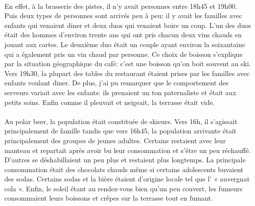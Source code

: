 \paragraph{} En effet, à la brasserie des pistes, il n'y avait personnes entre
18h45 et 19h00. Puis deux types de personnes sont arrivés peu à peu: il y avait
les familles avec enfants qui venaient diner et deux duos qui venaient boire un
coup. L'un des duos était des hommes d'environ trente ans qui ont pris chacun
deux vins chauds en jouant aux cartes. Le deuxième duo était un couple ayant
environ la soixantaine qui a également pris un vin chaud par personne. Ce choix
de boisson s'explique par la situation géographique du café: c'est une boisson
qu'on boit souvent au ski. Vers 19h30, la plupart des tables du restaurant
étaient prises par les familles avec enfants voulant diner. De plus, j'ai pu
remarquer que le comportement des serveurs variait avec les enfants: ils
prenaient un ton paternaliste et était aux petits soins. Enfin comme il
pleuvait et neigeait, la terrasse était vide.

\paragraph{} Au polar beer, la population était constituée de skieurs. Vers
16h, il s'agissait principalement de famille tandis que vers 16h45, la
population arrivante était principalement des groupes de jeunes adultes.
Certains restaient avec leur manteau et repartait après avoir bu leur
consommation et s'être un peu réchauffé. D'autres se déshabillaient un peu plus
et restaient plus longtemps. La principale consommation était des chocolats
chauds même si certains adolescents buvaient des sodas.  Certains sodas et la
bière étaient d'origine locale tel que l' « auvergnat cola ». Enfin, le soleil
étant au rendez-vous bien qu'un peu couvert, les fumeurs consommaient leurs
boissons et crêpes sur la terrasse tout en fumant.

